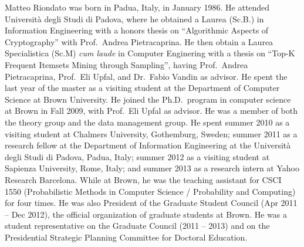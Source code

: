Matteo Riondato was born in Padua, Italy, in January 1986. He attended
Universit\`a degli Studi di Padova, where he obtained a Laurea (Sc.B.) in Information
Engineering with a honors thesis on ``Algorithmic Aspects of Cryptography'' with
Prof.~Andrea Pietracaprina. He then obtain a Laurea Specialistica (Sc.M)
\emph{cum laude} in Computer Enginering with a thesis on ``Top-K Frequent
Itemsets Mining through Sampling'', having Prof.~Andrea Pietracaprina, Prof.~Eli
Upfal, and Dr.~Fabio Vandin as advisor. He spent the last year of the master as
a visiting student at the Department of Computer Science at Brown University. He
joined the Ph.D.~program in computer science at Brown in Fall 2009, with
Prof.~Eli Upfal as advisor. He was a member of both the theory group and the
data management group. He spent summer 2010 as a visiting student at Chalmers
University, Gothemburg, Sweden; summer 2011 as a research fellow at the
Department of Information Engineering at the Universit\`a degli Studi di Padova,
Padua, Italy; summer 2012 as a visiting student at Sapienza University, Rome,
Italy; and summer 2013 as a research intern at Yahoo Research Barcelona. While
at Brown, he was the teaching assistant for CSCI 1550 (Probabilistic Methods in
Computer Science / Probability and Computing) for four times. He was also
President of the Graduate Student Council (Apr 2011 -- Dec 2012), the official
organization of graduate students at Brown. He was a student representative on
the Graduate Council (2011 -- 2013) and on the Presidential Strategic Planning
Committee for Doctoral Education.

